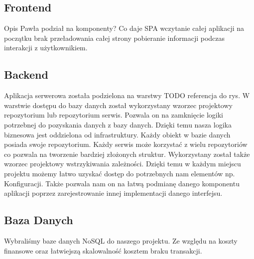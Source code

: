 \documentclass[a4paper,11pt]{report}
\begin{document}
\subsection{Frontend} 
Opis Pawła podział na komponenty?
Co daje SPA wczytanie całej aplikacji na początku brak przeładowania całej strony pobieranie informacji podczas interakcji z użytkownikiem. 
\subsection{Backend}
Aplikacja serwerowa została podzielona na warstwy TODO referencja do rys.
W warstwie dostępu do bazy danych został wykorzystany wzorzec projektowy repozytorium lub repozytorium serwis.
Pozwala on na zamknięcie logiki potrzebnej do pozyskania danych z bazy danych.
Dzięki temu nasza logika biznesowa jest oddzielona od infrastruktury.
Każdy obiekt w bazie danych posiada swoje repozytorium.
Każdy serwis może korzystać z wielu repozytoriów co pozwala na tworzenie bardziej złożonych struktur.
Wykorzystany został także wzorzec projektowy wstrzykiwania zależności.
Dzięki temu w każdym miejscu projektu możemy łatwo uzyskać dostęp do potrzebnych nam elementów np. Konfiguracji.
Także pozwala nam on na łatwą podmianę danego komponentu aplikacji poprzez zarejestrowanie innej implementacji danego interfejsu.

\subsection{Baza Danych}
Wybraliśmy baze danych NoSQL do naszego projektu. Ze względu na koszty finansowe oraz łatwiejszą skalowalność kosztem braku transakcji.
\end{document}

